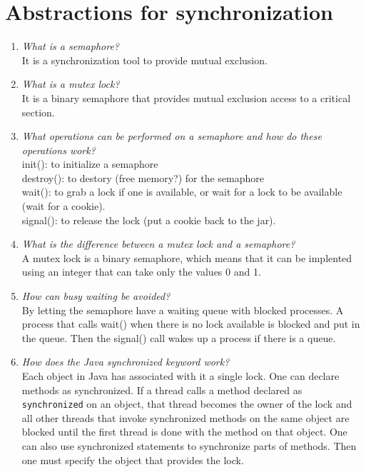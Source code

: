 \documentclass[a4paper]{article}
\begin{document}
\section{Abstractions for synchronization}
\begin{enumerate}

    \item \textit{ What is a semaphore? }\\

    It is a synchronization tool to provide mutual exclusion.

  \item \textit{ What is a mutex lock? }\\

    It is a binary semaphore that provides mutual exclusion access to a critical section. 

  \item \textit{ What operations can be performed on a semaphore and how do these operations work? }\\

    init(): to initialize a semaphore \\
    destroy(): to destory (free memory?) for the semaphore \\
    wait(): to grab a lock if one is available, or wait for a lock to be available (wait for a cookie). \\
    signal(): to release the lock (put a cookie back to the jar). 

  \item \textit{ What is the difference between a mutex lock and a semaphore? }\\

    A mutex lock is a binary semaphore, which means that it can be implented using an integer that can take only the values 0 and 1. 

  \item \textit{ How can busy waiting be avoided? }\\

    By letting the semaphore have a waiting queue with blocked processes. A process that calls wait() when there is no lock available is blocked and put in the queue. Then the signal() call wakes up a process if there is a queue.

  \item \textit{ How does the Java synchronized keyword work? }\\

    Each object in Java has associated with it a single lock. One can declare methods as synchronized. If a thread calls a method declared as \texttt{synchronized} on an object, that thread becomes the owner of the lock and all other threads that invoke synchronized methods on the same object are blocked until the first thread is done with the method on that object. One can also use synchronized statements to synchronize parts of methods. Then one must specify the object that provides the lock. 


\end{enumerate}
\end{document}
